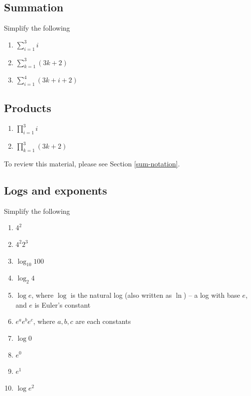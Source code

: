 \documentclass[]{book}
\providecommand{\tightlist}{%
  \setlength{\itemsep}{0pt}\setlength{\parskip}{0pt}}
\theoremstyle{definition}
\theoremstyle{definition}
\theoremstyle{definition}
\theoremstyle{remark}
\begin{document}
\hypertarget{summation}{%
\subsection*{Summation}\label{summation}}

Simplify the following

\begin{enumerate}
\def\labelenumi{\arabic{enumi}.}
\item
  \(\sum\limits_{i = 1}^3 i\)
\item
  \(\sum\limits_{k = 1}^3(3k + 2)\)
\item
  \(\sum\limits_{i= 1}^4 (3k + i + 2)\)
\end{enumerate}

\hypertarget{products}{%
\subsection*{Products}\label{products}}

\begin{enumerate}
\def\labelenumi{\arabic{enumi}.}
\item
  \(\prod\limits_{i= 1}^3 i\)
\item
  \(\prod\limits_{k=1}^3(3k + 2)\)
\end{enumerate}

To review this material, please see Section \ref{sum-notation}.

\hypertarget{logs-and-exponents}{%
\subsection*{Logs and exponents}\label{logs-and-exponents}}

Simplify the following

\begin{enumerate}
\def\labelenumi{\arabic{enumi}.}
\tightlist
\item
  \(4^2\)
\item
  \(4^2 2^3\)
\item
  \(\log_{10}100\)
\item
  \(\log_{2}4\)
\item
  \(\log e\), where \(\log\) is the natural log (also written as \(\ln\)) -- a log with base \(e\), and \(e\) is Euler's constant
\item
  \(e^a e^b e^c\), where \(a, b, c\) are each constants
\item
  \(\log 0\)
\item
  \(e^0\)
\item
  \(e^1\)
\item
  \(\log e^2\)
\end{enumerate}
\end{document}
